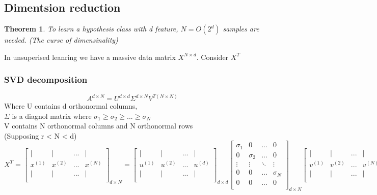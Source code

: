 \documentclass{article}
\newtheorem{theorem}{Theorem}[section]
\begin{document}
\subsection*{Dimentsion reduction} 
\begin{theorem}
    To learn a hypothesis class with d feature, $N = O(2^d)$ samples are needed. (The curse of dimensinality)
\end{theorem}

In unsuperised leanring we have a massive data matrix $X^{N \times d}$. Consider $X^T$

\subsubsection*{SVD decomposition}
\[A^{d \times N} = U^{d \times d}\Sigma^{d \times N} V^{T {(N \times N)}}\]
Where U contains d orthonormal columns, \\
$\Sigma$ is a diagnol matrix where $\sigma_1 \geq \sigma_2 \geq ... \geq \sigma_N$ \\
V contains N orthonormal columns and N orthonormal rows\\
(Supposing r < N < d)
\[X^T = \begin{bmatrix}
| & | & ... & | \\
x^{(1)} & x^{(2)} & ... & x^{(N)} \\
| & | & ... & | \\
\end{bmatrix}_{d \times N} = \begin{bmatrix}
    | & | & ... & | \\
    u^{(1)} & u^{(2)} & ... & u^{(d)} \\
    | & | & ... & | \\
    \end{bmatrix}_{d \times d} 
    \begin{bmatrix}
        \sigma_1 & 0 & ... & 0 \\
        0 & \sigma_2 & ... & 0 \\
        \vdots & \vdots & \ddots & \vdots \\
        0 & 0 & ... & \sigma_N \\
        0 & 0 & ... & 0 \\
        \end{bmatrix}_{d \times N}
        \begin{bmatrix}
            | & | & ... & | \\
            v^{(1)} & v^{(2)} & ... & v^{(N)} \\
            | & | & ... & | \\
            \end{bmatrix}^T_{N \times N}\]
\end{document}
